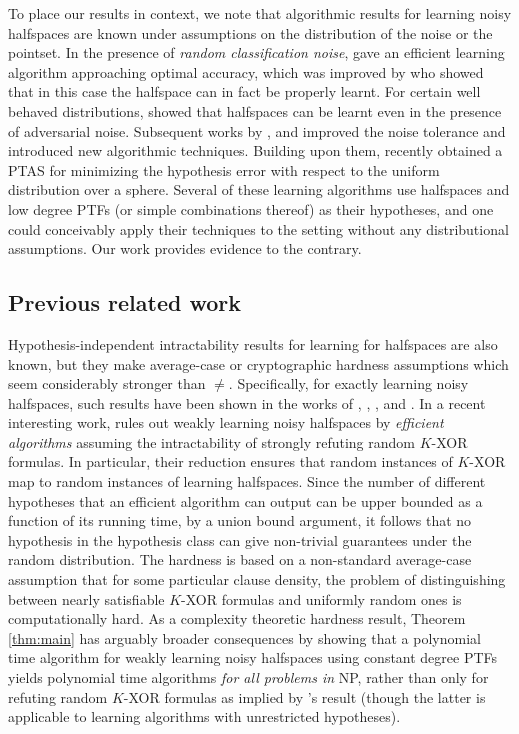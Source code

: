 To place our results in context, we note that algorithmic results for
learning noisy halfspaces are known under assumptions on the
distribution of the noise or the pointset.
In the presence of \emph{random
classification noise}, \cite{BFKV96}
gave an efficient learning algorithm approaching optimal accuracy, 
which was improved by \cite{Cohen97}
who showed that in this case the halfspace can in fact 
be properly learnt. For
certain well behaved distributions, \cite{KKMS05} showed that halfspaces can be learnt even in
the presence of adversarial noise. Subsequent works by 
\cite{KLS09}, and \cite{ABL17} improved the noise
tolerance and introduced new algorithmic techniques. Building upon
them, \cite{Daniely15} recently obtained a PTAS for minimizing
the hypothesis error with respect to the uniform distribution over a sphere.
Several of these learning algorithms
use halfspaces and low degree PTFs 
(or simple combinations thereof) as their hypotheses, 
and one could conceivably apply their techniques to the setting 
 without any distributional
assumptions. Our work provides evidence to the contrary.


\subsection{Previous related work}


Hypothesis-independent intractability results for 
learning for halfspaces are also known, but they make average-case or
cryptographic hardness assumptions which seem considerably stronger than
\Pclass$\neq$\NP.  Specifically, for exactly learning noisy halfspaces,
such results have been shown in the works of \cite{FGKP09}, \cite{KKMS05}, \cite{KK14}, and \cite{DS16}. In a
recent interesting work, \cite{Daniely16} rules out weakly learning
noisy halfspaces by \emph{efficient algorithms} assuming the intractability of strongly refuting random
$K$-XOR formulas. In particular, their reduction ensures that random instances of $K$-XOR map to random instances of learning halfspaces. Since the number of different hypotheses that an efficient algorithm can output can be upper bounded as a function of its running time, by a union bound argument, it follows that no hypothesis in the hypothesis class can give non-trivial guarantees under the random distribution. The hardness is based on a non-standard average-case assumption that for some particular clause density, the problem of distinguishing between nearly satisfiable $K$-XOR formulas and uniformly random ones is computationally hard. As a complexity theoretic hardness result, Theorem \ref{thm:main} has arguably broader consequences by showing that a polynomial time algorithm for weakly learning noisy halfspaces using constant degree PTFs yields polynomial time algorithms %
\emph{for all problems in} NP, rather than only for refuting random $K$-XOR formulas as implied by \cite{Daniely16}'s result (though the latter is applicable to learning algorithms with unrestricted hypotheses). 


